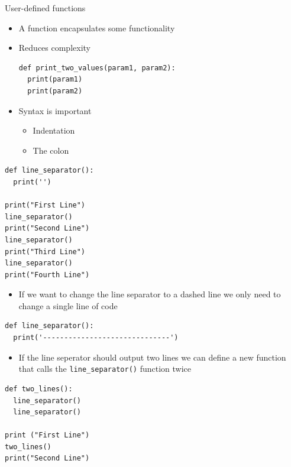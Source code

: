 \documentclass[10pt, a4paper]{beamer} %
\begin{document}
\begin{frame}
\framebreak

\begin{block}{User-defined functions}
  \begin{itemize}
    \item A function encapsulates some functionality
    \item Reduces complexity
    \begin{lstlisting}
def print_two_values(param1, param2):
  print(param1)
  print(param2)
    \end{lstlisting}
    \item Syntax is important
    \begin{itemize}
      \item Indentation
      \item The colon
    \end{itemize}
  \end{itemize}
\end{block}
\framebreak
\begin{examples}
  \begin{lstlisting}
def line_separator():
  print('')

print("First Line")
line_separator()
print("Second Line")
line_separator()
print("Third Line")
line_separator()
print("Fourth Line")
\end{lstlisting}
\end{examples}
\begin{itemize}
  \item If we want to change the line separator to a dashed line we only need to change a single line of code
\end{itemize}
\begin{lstlisting}
def line_separator():
  print('------------------------------')
\end{lstlisting}


\framebreak

\begin{examples}
  \begin{itemize}
    \item If the line seperator should output two lines we can define a new function that calls the \lstinline!line_separator()! function twice
  \end{itemize}
  \begin{lstlisting}
def two_lines():
  line_separator()
  line_separator()

print ("First Line")
two_lines()
print("Second Line")
  \end{lstlisting}
\end{examples}


\end{frame}
\end{document}
